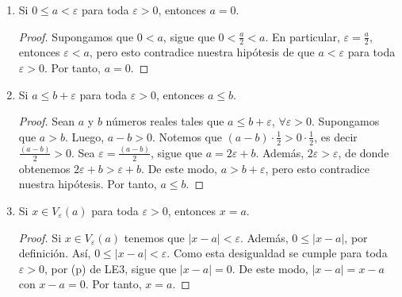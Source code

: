 \documentclass[11pt]{article}
\let\epsilon\varepsilon
\begin{document}
\begin{enumerate}[label=\alph*)]
    \item Si $0 \leq a < \varepsilon$ para toda $\varepsilon > 0$, entonces $a=0$.
    
    \vspace{-1em}\begin{proof} 
        Supongamos que $0<a$, sigue que $0<\frac{a}{2}<a$. En particular, $\epsilon=\frac{a}{2}$, entonces $\varepsilon<a$, pero esto contradice nuestra hipótesis de que $a< \varepsilon$ para toda $\varepsilon>0$. Por tanto, $a=0$.    
    \end{proof} \vspace{-1em}

    \item Si $a \leq b + \varepsilon$ para toda $\varepsilon > 0$, entonces $a \leq b$.
    
    \vspace{-1em}\begin{proof} 
        Sean $a$ y $b$ números reales tales que $a \leq b + \varepsilon$, $\forall \varepsilon > 0$. Supongamos que $a > b$. Luego, $a-b>0$. Notemos que $(a-b) \cdot \frac{1}{2} > 0 \cdot \frac{1}{2}$, es decir $\frac{(a-b)}{2} > 0$. Sea $\varepsilon = \frac{(a-b)}{2}$, sigue que $a=2\varepsilon+b$. Además, $2\varepsilon > \varepsilon$, de donde obtenemos $2 \varepsilon + b > \varepsilon + b$. De este modo, $a > b+\varepsilon$, pero esto contradice nuestra hipótesis. Por tanto, $a \leq b$.    
    \end{proof} \vspace{-1em}

    \item Si $x\in V_\varepsilon(a)$ para toda $\varepsilon>0$, entonces $x=a$.
    \vspace{-1em}\begin{proof} 
        Si $x\in V_\varepsilon(a)$ tenemos que $|x-a|<\varepsilon$. Además, $0\leq |x-a|$, por definición. Así, $0\leq |x-a|<\varepsilon$. Como esta desigualdad se cumple para toda $\varepsilon>0$, por (p) de LE3, sigue que $|x-a|=0$. De este modo, $|x-a|=x-a$ con $x-a=0$. Por tanto, $x=a$.    
    \end{proof} \vspace{-1em}


\end{enumerate}
\end{document}
